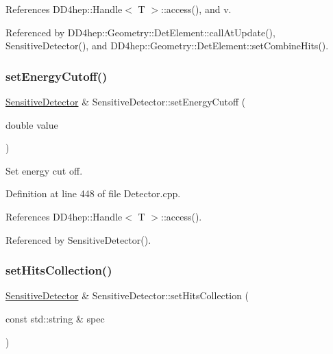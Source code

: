 References D\+D4hep\+::\+Handle$<$ T $>$\+::access(), and v.



Referenced by D\+D4hep\+::\+Geometry\+::\+Det\+Element\+::call\+At\+Update(), Sensitive\+Detector(), and D\+D4hep\+::\+Geometry\+::\+Det\+Element\+::set\+Combine\+Hits().

\hypertarget{class_d_d4hep_1_1_geometry_1_1_sensitive_detector_a43bc3d1e14b74fbaa85043dedb940a39}{}\label{class_d_d4hep_1_1_geometry_1_1_sensitive_detector_a43bc3d1e14b74fbaa85043dedb940a39} 
\subsubsection{\texorpdfstring{set\+Energy\+Cutoff()}{setEnergyCutoff()}}
{\footnotesize\ttfamily \hyperlink{class_d_d4hep_1_1_geometry_1_1_sensitive_detector}{Sensitive\+Detector} \& Sensitive\+Detector\+::set\+Energy\+Cutoff (\begin{DoxyParamCaption}\item[{double}]{value }\end{DoxyParamCaption})}



Set energy cut off. 



Definition at line 448 of file Detector.\+cpp.



References D\+D4hep\+::\+Handle$<$ T $>$\+::access().



Referenced by Sensitive\+Detector().

\hypertarget{class_d_d4hep_1_1_geometry_1_1_sensitive_detector_ac6d3cc86dffcd05371fe6c6d27e41b45}{}\label{class_d_d4hep_1_1_geometry_1_1_sensitive_detector_ac6d3cc86dffcd05371fe6c6d27e41b45} 
\subsubsection{\texorpdfstring{set\+Hits\+Collection()}{setHitsCollection()}}
{\footnotesize\ttfamily \hyperlink{class_d_d4hep_1_1_geometry_1_1_sensitive_detector}{Sensitive\+Detector} \& Sensitive\+Detector\+::set\+Hits\+Collection (\begin{DoxyParamCaption}\item[{const std\+::string \&}]{spec }\end{DoxyParamCaption})}



